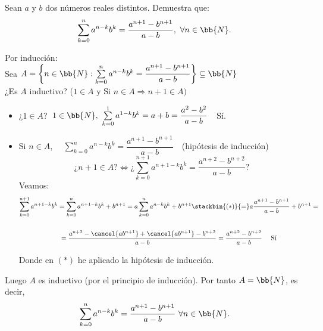 \documentclass[12pt]{article}
\begin{document}
    \begin{ejercicio}[2 puntos]
        Sean $a$ y $b$ dos números reales distintos. Demuestra que:
        \begin{gather*}
            \sum_{k=0}^n a^{n-k}b^k = \dfrac{a^{n+1}-b^{n+1}}{a-b}, \ \forall n \in \bb{N}.
        \end{gather*}

        Por inducción:\\
        
        Sea $A=\left\{n \in \bb{N} : \sum\limits_{k=0}^n a^{n-k}b^k = \dfrac{a^{n+1}-b^{n+1}}{a-b}\right\}\subseteq \bb{N}$\\
        
        ¿Es $A$ inductivo? ($1 \in A$ y Si $n\in A \Longrightarrow n+1 \in A)$

        \begin{itemize}[label=$\ast$]
            \item ¿$1\in A$?\ $1 \in \bb{N},\ \sum\limits_{k=0}^1 a^{1-k}b^k = a + b =\dfrac{a^2 - b^2}{a-b}$\ \ Sí.
            \item Si $n\in A$, \ \ $\sum\limits_{k=0}^n a^{n-k}b^k=\dfrac{a^{n+1}-b^{n+1}}{a-b}$\ \ (hipótesis de inducción)
            \[
                \text{¿}n+1\in A\text{?} \Longleftrightarrow \text{¿}\sum\limits_{k=0}^{n+1} a^{n+1-k}b^k = \dfrac{a^{n+2}-b^{n+2}}{a-b}\text{?}
            \]
            Veamos:
            \begin{gather*}
                \sum\limits_{k=0}^{n+1} a^{n+1-k}b^k = \sum\limits_{k=0}^{n} a^{n+1-k}b^k + b^{n+1} =
                 a\sum\limits_{k=0}^{n} a^{n-k}b^k + b^{n+1} \stackbin{(\ast)}{=} a \dfrac{a^{n+1}-b^{n+1}}{a-b} + b^{n+1} =\\\\
                 =\dfrac{a^{n+2}-\cancel{ab^{n+1}}+\cancel{ab^{n+1}}-b^{n+2}}{a-b} = \dfrac{a^{n+2}-b^{n+2}}{a-b}\ \ \ \text{ Sí}
            \end{gather*}

            Donde en $(\ast)$ he aplicado la hipótesis de inducción.
        \end{itemize}

        Luego $A$ es inductivo (por el principio de inducción). Por tanto $A=\bb{N}$, es decir, 
        \[
            \sum\limits_{k=0}^n a^{n-k}b^k = \dfrac{a^{n+1}-b^{n+1}}{a-b}\ \forall n \in \bb{N}.
        \]
        
    \end{ejercicio}
\end{document}
